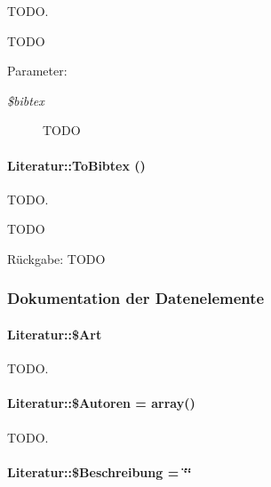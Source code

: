 TODO. 

TODO \begin{Desc}
\item[Parameter:]
\begin{description}
\item[{\em \$bibtex}]TODO \end{description}
\end{Desc}
\hypertarget{classLiteratur_11f6d1a4409c41638ff6693f65699ff3}{
\paragraph[ToBibtex]{\setlength{\rightskip}{0pt plus 5cm}Literatur::To\-Bibtex ()}\hfill}
\label{classLiteratur_11f6d1a4409c41638ff6693f65699ff3}


TODO. 

TODO \begin{Desc}
\item[R\"{u}ckgabe:]TODO \end{Desc}


\subsubsection{Dokumentation der Datenelemente}
\hypertarget{classLiteratur_fb4d4b1ce29a33a10e3e27d47f31a447}{
\paragraph[\$Art]{\setlength{\rightskip}{0pt plus 5cm}Literatur::\$Art}\hfill}
\label{classLiteratur_fb4d4b1ce29a33a10e3e27d47f31a447}


TODO. 

\hypertarget{classLiteratur_01b311917d78c1dbb346435598ebba64}{
\paragraph[\$Autoren]{\setlength{\rightskip}{0pt plus 5cm}Literatur::\$Autoren = array()}\hfill}
\label{classLiteratur_01b311917d78c1dbb346435598ebba64}


TODO. 

\hypertarget{classLiteratur_6769ff8b353d2f789125f009b4dcfdc0}{
\paragraph[\$Beschreibung]{\setlength{\rightskip}{0pt plus 5cm}Literatur::\$Beschreibung = \char`\"{}\char`\"{}}\hfill}
\label{classLiteratur_6769ff8b353d2f789125f009b4dcfdc0}


